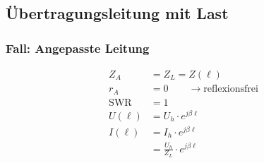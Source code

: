 \subsection{Übertragungsleitung mit Last}




\subsubsection{Fall: Angepasste Leitung}
\begin{align*}
    Z_A          & = Z_L = Z(\ell)                              \\
    r_A          & = 0\qquad\rightarrow\text{reflexionsfrei} \\
    \mathrm{SWR} & = 1                                       \\
    U(\ell)         & = U_h\cdot e ^{j\beta \ell}                  \\
    I(\ell)         & = I_h \cdot e^{j\beta \ell}                  \\
                 & = \frac{U_h}{Z_L}\cdot e^{j\beta \ell}
\end{align*}

